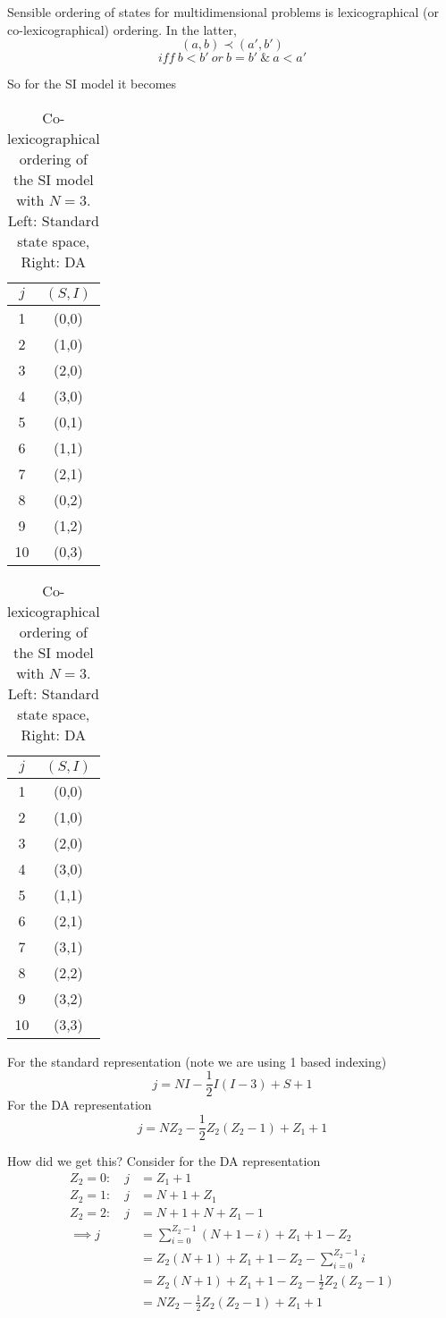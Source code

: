 \documentclass{X:/Documents/Coding/Latex/myassignment}
\begin{document}
\clearpage
Sensible ordering of states for multidimensional problems is lexicographical (or co-lexicographical) ordering. In the latter,
\[(a,b) \prec (a',b')\]
\[iff \ b < b' \ or \  b = b' \ \& \ a < a'\]


So for the SI model it becomes
\begin{table}[h]
    \centering
    \begin{tabular}{c|c}
         $j$&$(S,I)$ \\\hline
         1&(0,0)\\
         2&(1,0)\\
         3&(2,0)\\
         4&(3,0)\\
         5&(0,1)\\
         6&(1,1)\\
         7&(2,1)\\
         8&(0,2)\\
         9&(1,2)\\
         10&(0,3)\\
    \end{tabular}
        \begin{tabular}{c|c}
         $j$&$(S,I)$ \\\hline
         1&(0,0)\\
         2&(1,0)\\
         3&(2,0)\\
         4&(3,0)\\
         5&(1,1)\\
         6&(2,1)\\
         7&(3,1)\\
         8&(2,2)\\
         9&(3,2)\\
         10&(3,3)\\
    \end{tabular}
    \caption{Co-lexicographical ordering of the SI model with $N=3$. Left: Standard state space, Right: DA}
\end{table}


For the standard representation (note we are using 1 based indexing)
\[j = N I - \frac12 I ( I -3) + S + 1\]
For the DA representation
\[j = NZ_2 - \frac12 Z_2 (Z_2 -1) + Z_1 + 1\]

How did we get this?
Consider for the DA representation
\begin{align*}
    Z_2 = 0 : \quad j &= Z_1 + 1\\
    Z_2 = 1 : \quad j &= N+1 + Z_1\\
    Z_2 = 2 : \quad j &= N+1 + N + Z_1 - 1\\
    \implies j&= \sum_{i=0}^{Z_2-1} (N+1-i) + Z_1 + 1 - Z_2\\
    &= Z_2 (N+1) + Z_1 + 1 - Z_2 - \sum_{i=0}^{Z_2-1} i\\
    &= Z_2 (N+1) + Z_1 + 1 - Z_2 - \frac12 Z_2 (Z_2-1)\\
    &= NZ_2 - \frac12 Z_2 (Z_2 - 1) + Z_1 + 1
\end{align*}
\end{document}
